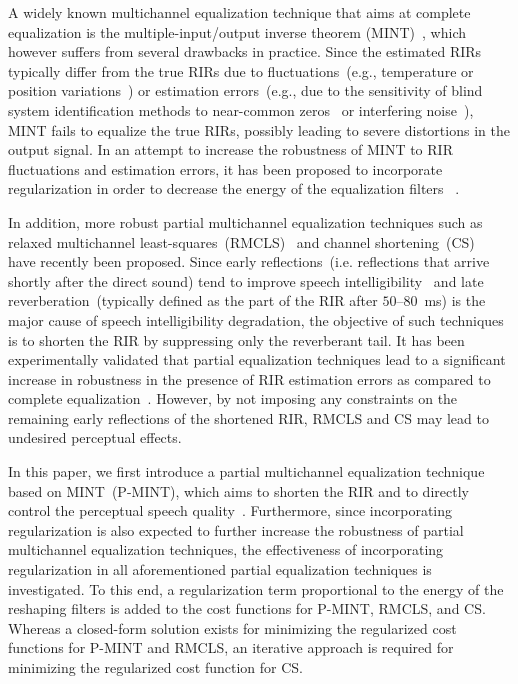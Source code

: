 \documentclass[10pt]{IEEEtran}
\begin{document}
A widely known multichannel equalization technique that aims at complete equalization is the multiple-input/output inverse theorem (MINT)~\cite{Miyoshi_ITASS_1988}, which however suffers from several drawbacks in practice.
Since the estimated RIRs typically differ from the true RIRs due to fluctuations~(e.g., temperature or position variations~\cite{Radlovic_ITSA_2000}) or estimation errors~(e.g., due to the sensitivity of blind system identification methods to near-common zeros~\cite{Lin_ITASLP_2012} or interfering noise~\cite{Hasan_EUSIPCO_2006}), MINT fails to equalize the true RIRs, possibly leading to severe distortions in the output signal.
In an attempt to increase the robustness of MINT to RIR fluctuations and estimation errors, it has been proposed to incorporate regularization in order to decrease the energy of the equalization filters~\cite{Hikichi_EURASIP_2007} .

In addition, more robust partial multichannel equalization techniques such as relaxed multichannel least-squares~(RMCLS)~\cite{Zhang_IWAENC_2010} and channel shortening~(CS)~\cite{Kallinger_ICASSP_2006} have recently been proposed.
Since early reflections~(i.e. reflections that arrive shortly after the direct sound) tend to improve speech intelligibility~\cite{Arweiler_JASA_2011,Warzybok_Acusticum_2011} and late reverberation~(typically defined as the part of the RIR after $50$--$80$~ms) is the major cause of speech intelligibility degradation, the objective of such techniques is to shorten the RIR by suppressing only the reverberant tail.
It has been experimentally validated that partial equalization techniques lead to a significant increase in robustness in the presence of RIR estimation errors as compared to complete equalization~\cite{Zhang_IWAENC_2010}.
However, by not imposing any constraints on the remaining early reflections of the shortened RIR, RMCLS and CS may lead to undesired perceptual effects.

In this paper, we first introduce a partial multichannel equalization technique based on MINT~(P-MINT), which aims to shorten the RIR and to directly control the perceptual speech quality~\cite{Kodrasi_ICASSP_2012}.
Furthermore, since incorporating regularization is also expected to further increase the robustness of partial multichannel equalization techniques, the effectiveness of incorporating regularization in all aforementioned partial equalization techniques is investigated.
To this end, a regularization term proportional to the energy of the reshaping filters is added to the cost functions for P-MINT, RMCLS, and CS.
Whereas a closed-form solution exists for minimizing the regularized cost functions for P-MINT and RMCLS, an iterative approach is required for minimizing the regularized cost function for CS.
\end{document}
